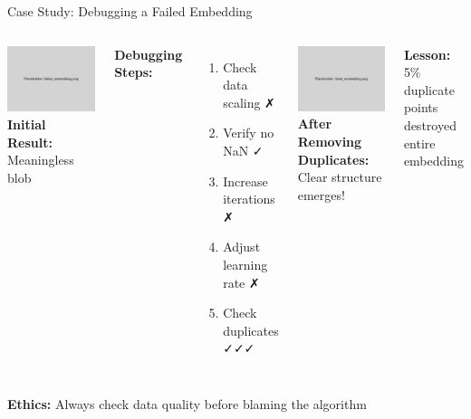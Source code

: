 \documentclass[aspectratio=169]{beamer}
\newcommand{\ethics}[1]{\colorbox{purple!10}{\textcolor{ethicscolor}{\textbf{Ethics:} #1}}}
\begin{document}
\begin{frame}{Case Study: Debugging a Failed Embedding}
\begin{columns}
\includegraphics[width=\textwidth]{./Figures/failed_embedding.png}
\textbf{Initial Result:} Meaningless blob

\textbf{Debugging Steps:}
\begin{enumerate}
\item Check data scaling ✗
\item Verify no NaN ✓
\item Increase iterations ✗
\item Adjust learning rate ✗
\item Check duplicates ✓✓✓
\end{enumerate}

\includegraphics[width=\textwidth]{./Figures/fixed_embedding.png}
\textbf{After Removing Duplicates:}\\
Clear structure emerges!

\textbf{Lesson:} 5\% duplicate points destroyed entire embedding
\end{columns}

\ethics{Always check data quality before blaming the algorithm}
\end{frame}
\end{document}
